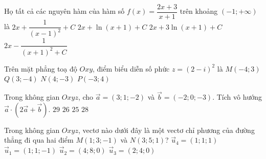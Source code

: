\begin{ex}%
Họ tất cả các nguyên hàm của hàm số $f(x)=\dfrac{2x+3}{x+1}$ trên khoảng $(-1;+\infty)$ là	
	\choice
	{$2x+\dfrac{1}{(x-1)^2}+C$}
	{\True $2x+\ln (x+1)+C$}
	{$2x+3\ln (x+1)+C$}
	{$2x-\dfrac{1}{(x+1)^2+C}$}
\end{ex}

\begin{ex}%
	Trên mặt phẳng toạ độ $Oxy$, điểm biểu diễn số phức $z=(2-i)^2$  là
	\choice
	{$M(-4;3)$}
	{\True $Q(3;-4)$}
	{$N(4;-3)$}
	{$P(-3;4)$}
\end{ex}

\begin{ex}%
	Trong không gian $Oxyz$, cho $\overrightarrow{a}=(3;1;-2)$ và $\overrightarrow{b}=(-2;0;-3)$. Tích vô hướng $\overrightarrow{a}\cdot \left( 2\overrightarrow{a}+\overrightarrow{b}\right) $.
	\choice
	{$29$}
	{$26$}
	{$25$}
	{\True $28$}
\end{ex}

\begin{ex}%
	Trong không gian $Oxyz$, vectơ nào dưới đây là một vectơ chỉ phương của đường thẳng đi qua hai điểm $M(1;3;-1)$ và $N(3;5;1)$?
	\choice
	{\True $\overrightarrow{u}_4=(1;1;1)$}
	{$\overrightarrow{u}_1=(1;1;-1)$}
	{$\overrightarrow{u}_2=(4;8;0)$}
	{$\overrightarrow{u}_3=(2;4;0)$}
\end{ex}

